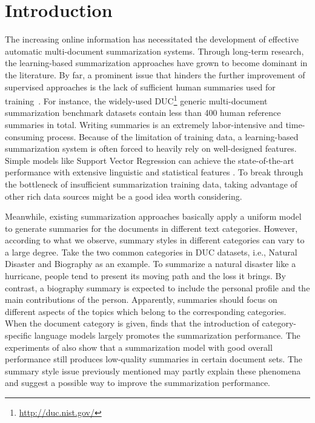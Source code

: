 \documentclass[letterpaper]{article}
\begin{document}
\section{Introduction}
The increasing online information has necessitated the development of effective automatic multi-document summarization systems.
Through long-term research, the learning-based summarization approaches have grown to become dominant in the literature.
By far, a prominent issue that hinders the further improvement of supervised approaches is the lack of sufficient human summaries used for training~\cite{ziqiang2016tgsum}.
For instance, the widely-used DUC\footnote{\url{http://duc.nist.gov/}} generic multi-document summarization benchmark datasets contain less than 400 human reference summaries in total.
Writing summaries is an extremely labor-intensive and time-consuming process.
Because of the limitation of training data, a learning-based summarization system is often forced to heavily rely on well-designed features.
Simple models like Support Vector Regression can achieve the state-of-the-art performance with extensive linguistic and statistical features \cite{hong2014improving}.
To break through the bottleneck of insufficient summarization training data, taking advantage of other rich data sources might be a good idea worth considering.

Meanwhile, existing summarization approaches basically apply a uniform model to generate summaries for the documents in different text categories.
However, according to what we observe, summary styles in different categories can vary to a large degree.
Take the two common categories in DUC datasets, i.e., Natural Disaster and Biography as an example.
To summarize a natural disaster like a hurricane, people tend to present its moving path and the loss it brings.
By contrast, a biography summary is expected to include the personal profile and the main contributions of the person.
Apparently, summaries should focus on different aspects of the topics which belong to the corresponding categories.
When the document category is given, \cite{kedzie-mckeown-diaz:2015:ACL-IJCNLP}
 finds that the introduction of category-specific language models largely promotes the summarization performance.
The experiments of \cite{wan2015multi} also show that a summarization model with good overall performance still produces low-quality summaries in certain document sets.
The summary style issue previously mentioned may partly explain these phenomena and suggest a possible way to improve the summarization performance.
\end{document}
